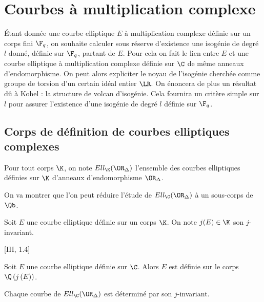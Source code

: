 \section{Courbes à multiplication complexe}



Étant donnée une courbe elliptique $E$ à multiplication complexe définie sur un corps fini $\F_{q}$, on souhaite calculer sous réserve d'existence une isogénie de degré $l$ donné, définie sur $\F_{q}$, partant de $E$. Pour cela on fait le lien entre $E$ et une courbe elliptique à multiplication complexe définie sur $\C$ de même anneaux d'endomorphisme. On peut alors expliciter le noyau de l'isogénie cherchée comme groupe de torsion d'un certain idéal entier $\LR$. On énoncera de plus un résultat dû à Kohel : la structure de volcan d'isogénie. Cela fournira un critère simple sur $l$ pour assurer l'existence d'une isogénie de degré $l$ définie sur $\F_{q}$.  










\subsection{Corps de définition de courbes elliptiques complexes}


\begin{Def}
	Pour tout corps $\K$, on note $Ell_{\K}(\OR_{\Delta})$ l'ensemble des courbes elliptiques définies sur $\K$ d'anneaux d'endomorphisme $\OR_{\Delta}$.
\end{Def}

On va montrer que l'on peut réduire l'étude de $Ell_{\C}(\OR_{\Delta})$ à un sous-corps de $\Qb$.

\begin{Def}
	Soit $E$ une courbe elliptique définie sur un corps $\K$. On note $j(E)\in\K$ son $j$-invariant. 
\end{Def}

\begin{Prop}\cite{Sil09}[III, 1.4]
	
	Soit $E$ une courbe elliptique définie sur $\C$. Alors $E$ est définie sur le corps $\Q\left( j\left( E\right) \right) $.
	
\end{Prop}

Chaque courbe de $Ell_{\C}(\OR_{\Delta})$ est déterminé par son $j$-invariant.

